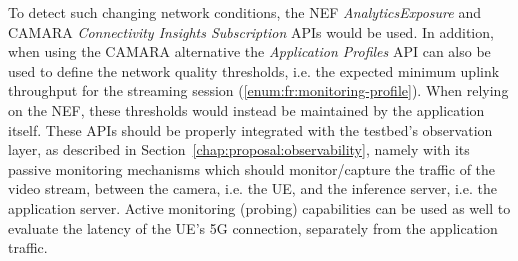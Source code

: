 To detect such changing network conditions, the \acs{NEF} \textit{AnalyticsExposure} and CAMARA \textit{Connectivity Insights Subscription} \acsp{API} would be used. In addition, when using the CAMARA alternative the \textit{Application Profiles} \acs{API} can also be used to define the network quality thresholds, i.e. the expected minimum uplink throughput for the streaming session (\ref{enum:fr:monitoring-profile}). When relying on the \acs{NEF}, these thresholds would instead be maintained by the application itself. These \acsp{API} should be properly integrated with the testbed's observation layer, as described in Section~\ref{chap:proposal:observability}, namely with its passive monitoring mechanisms which should monitor/capture the traffic of the video stream, between the camera, i.e. the \acs{UE}, and the inference server, i.e. the application server. Active monitoring (probing) capabilities can be used as well to evaluate the latency of the \acs{UE}'s \acs{5G} connection, separately from the application traffic.

